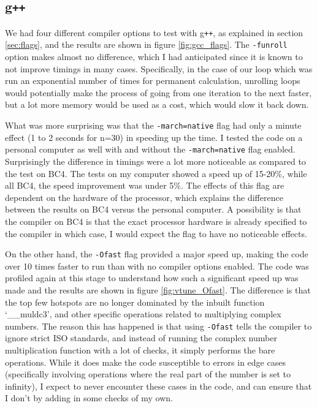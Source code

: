 \documentclass[ %
                    author={Manan Vaswani},
                supervisor={Dr. Raphael Clifford},
                    degree={MEng},
                     title={A multi-core CPU implementation of the classical Boson Sampling algorithm},
                  subtitle={},
                      type={},
                      year={2019} ]{dissertation}
\theoremstyle{plain}
\theoremstyle{definition}
\begin{document}
\subsection{g\texttt{++}}
We had four different compiler options to test with g\texttt{++}, as explained in section \ref{sec:flags}, and the results are shown in figure \ref{fig:gcc_flags}. The \texttt{-funroll} option makes almost no difference, which I had anticipated since it is known to not improve timings in many cases. Specifically, in the case of our loop which was run an exponential number of times for permanent calculation, unrolling loops would potentially make the process of going from one iteration to the next faster, but a lot more memory would be used as a cost, which would slow it back down. 

What was more surprising was that the \texttt{-march=native} flag had only a minute effect (1 to 2 seconds for n=30) in speeding up the time. I tested the code on a personal computer as well with and without the  \texttt{-march=native} flag enabled. Surprisingly the difference in timings were a lot more noticeable as compared to the test on BC4. The tests on my computer showed a speed up of 15-20\%, while all BC4, the speed improvement was under 5\%. The effects of this flag are dependent on the hardware of the processor, which explains the difference between the results on BC4 versus the personal computer. A possibility is that the compiler on BC4 is that the exact processor hardware is already specified to the compiler in which case, I would expect the flag to have no noticeable effects.

On the other hand, the \texttt{-Ofast} flag provided a major speed up, making the code over 10 times faster to run than with no compiler options enabled. The code was profiled again at this stage to understand how such a significant speed up was made and the results are shown in figure \ref{fig:vtune_Ofast}. The difference is that the top few hotspots are no longer dominated by the inbuilt function `\_\_muldc3', and other specific operations related to multiplying complex numbers. The reason this has happened is that using \texttt{-Ofast} tells the compiler to ignore strict ISO standards, and instead of running the complex number multiplication function with a lot of checks, it simply performs the bare operations. While it does make the code susceptible to errors in edge cases (specifically involving operations where the real part of the number is set to infinity), I expect to never encounter these cases in the code, and can ensure that I don't by adding in some checks of my own.
\end{document}
